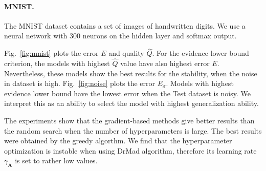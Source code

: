 \documentclass[smallcondensed]{svjour3}
\begin{document}
\paragraph{MNIST.}
The MNIST dataset contains a set of images of handwritten digits. 
We use a neural network with 300 neurons on the hidden layer and softmax output.


Fig.~\ref{fig:mnist} plots the error $E$ and quality $\hat{Q}$.
For the evidence lower bound criterion, the models with highest $\hat{Q}$ value have also highest error $E$. Nevertheless, 
these models show the best results for the stability, when the noise in dataset is high. Fig.~\ref{fig:noise} plots  the error $E_\sigma$. Models with highest evidence lower bound have the lowest error when the Test dataset is noisy. We interpret this as an ability to select the model with highest generalization ability.

The experiments show that the gradient-based methods give better results than the random search when the number of hyperparameters is large. The best results were obtained by the greedy algorthm. We find that the hyperparameter optimization is instable when using DrMad algorithm, therefore its learning rate  $\gamma_{\mathbf{A}}$ is set to rather low values.
\end{document}
